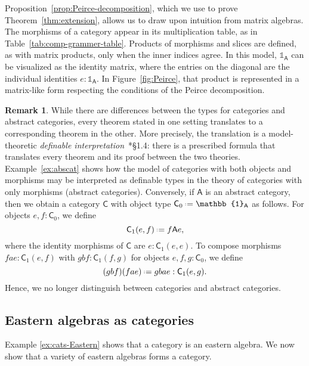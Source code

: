 \documentclass{amsart}
\newcommand{\tin}{:}
\newcommand{\Cat}[1]{\mathsf{#1}}
\newcommand{\cat}[1]{\Cat{#1}}
\newcommand{\acat}[1]{\mathsf{#1}}
\numberwithin{lstfloat}{section}
\newcommand{\one}{\mathbb{1}}
\newcommand{\defeq}{\mathrel{\hstretch{.13}{=}\hspace{.2ex}{=}}}
\theoremstyle{definition}
\newtheorem{rem}[thm]{Remark}
\theoremstyle{remark}
\numberwithin{equation}{section}
\begin{document}
Proposition~\ref{prop:Peirce-decomposition}, which we use to prove Theorem~\ref{thm:extension},
allows us to draw upon intuition from matrix algebras.  
The morphisms of a category appear in its multiplication table, as in 
Table~\ref{tab:comp-grammer-table}. Products of morphisms and slices are defined, as with
matrix products, only when the inner indices agree. In this model, $\one_{\cat{A}}$ can be
visualized as the identity matrix, where the entries on the diagonal are the
individual identities $e\tin \one_{\cat{A}}$. In Figure~\ref{fig:Peirce}, 
that product is
represented in a matrix-like form respecting the conditions of the Peirce
decomposition.

\begin{rem}
  \label{rem:bi-inter} 
  While there are differences between the types for categories and 
abstract categories, every theorem stated in one
  setting translates to a corresponding theorem in the other.  More
  precisely, the translation is a model-theoretic \emph{definable
  interpretation}~\cite{Marker:models}*{\S1.4}: there is a prescribed
  formula that translates every theorem and its proof between the two theories.
  Example~\ref{ex:abscat} shows how the model of categories with both objects and
  morphisms may be interpreted as definable types in the
  theory of categories with only morphisms (abstract categories). Conversely, if
  $\acat{A}$ is an abstract category, then we obtain a category
  $\cat{C}$ with object type $\cat{C}_0\defeq \one_{\acat{A}}$ as follows. For objects 
  $e,f\tin \cat{C}_0$, we define 
  \[ 
    \cat{C}_1(e,f)  \defeq  f \cat{A} e,
  \]
  where the identity morphisms of $\acat{C}$ are $e:\cat{C}_1(e,e)$.
  To compose morphisms $fae : \cat{C}_1(e,f)$ with $gbf:\cat{C}_1(f,g)$ for objects $e,f,g:\cat{C}_0$, we define 
  \[
    (gbf)(fae) \defeq gbae : \cat{C}_1(e, g).
  \]  
  Hence, we no longer distinguish between categories and
  abstract categories. 
\end{rem}

\subsection{Eastern algebras as categories}
Example \ref{ex:cats-Eastern} shows that a category is an eastern algebra. 
We now show that a variety of eastern algebras forms a category.
\end{document}
